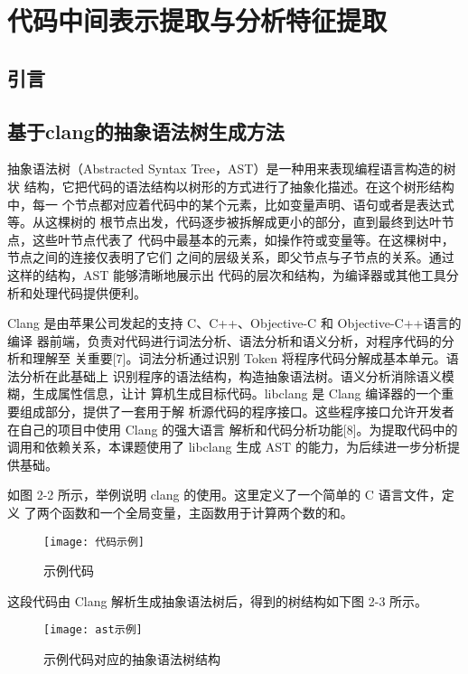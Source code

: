 
\chapter{代码中间表示提取与分析特征提取}

\section{引言}

\section{基于clang的抽象语法树生成方法}
抽象语法树（Abstracted Syntax Tree，AST）是一种用来表现编程语言构造的树状
结构，它把代码的语法结构以树形的方式进行了抽象化描述。在这个树形结构中，每一
个节点都对应着代码中的某个元素，比如变量声明、语句或者是表达式等。从这棵树的
根节点出发，代码逐步被拆解成更小的部分，直到最终到达叶节点，这些叶节点代表了
代码中最基本的元素，如操作符或变量等。在这棵树中，节点之间的连接仅表明了它们
之间的层级关系，即父节点与子节点的关系。通过这样的结构，AST 能够清晰地展示出
代码的层次和结构，为编译器或其他工具分析和处理代码提供便利。


Clang 是由苹果公司发起的支持 C、C++、Objective-C 和 Objective-C++语言的编译
器前端，负责对代码进行词法分析、语法分析和语义分析，对程序代码的分析和理解至
关重要[7]。词法分析通过识别 Token 将程序代码分解成基本单元。语法分析在此基础上
识别程序的语法结构，构造抽象语法树。语义分析消除语义模糊，生成属性信息，让计
算机生成目标代码。libclang 是 Clang 编译器的一个重要组成部分，提供了一套用于解
析源代码的程序接口。这些程序接口允许开发者在自己的项目中使用 Clang 的强大语言
解析和代码分析功能[8]。为提取代码中的调用和依赖关系，本课题使用了 libclang 生成
AST 的能力，为后续进一步分析提供基础。


如图 2-2 所示，举例说明 clang 的使用。这里定义了一个简单的 C 语言文件，定义
了两个函数和一个全局变量，主函数用于计算两个数的和。
\begin{figure}[h]
\centering
\texttt{[image: 代码示例]}
\caption{示例代码}
\end{figure}

这段代码由 Clang 解析生成抽象语法树后，得到的树结构如下图 2-3 所示。
\begin{figure}[h]
\centering
\texttt{[image: ast示例]}
\caption{示例代码对应的抽象语法树结构}
\end{figure}

